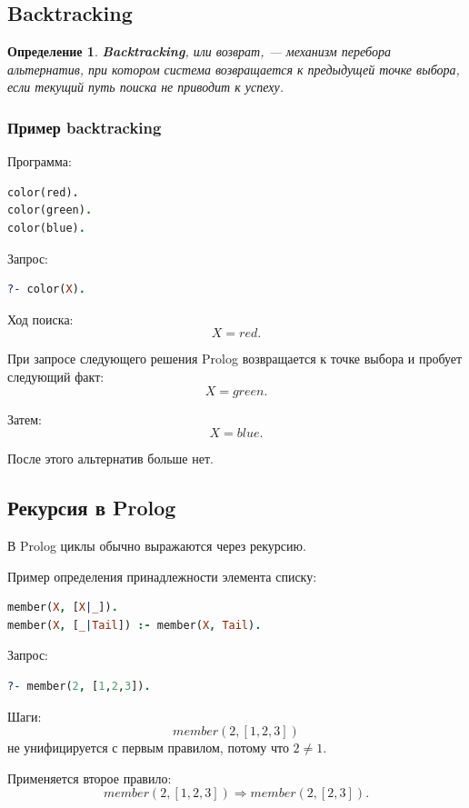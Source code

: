 \documentclass[12pt,a4paper]{article}
\newtheorem{definition}{Определение}
\begin{document}
\subsection{Backtracking}

\begin{definition}
\textbf{Backtracking}, или возврат, --- механизм перебора альтернатив, при котором система возвращается к предыдущей точке выбора, если текущий путь поиска не приводит к успеху.
\end{definition}

\subsubsection{Пример backtracking}

Программа:
\begin{lstlisting}[language=Prolog]
color(red).
color(green).
color(blue).
\end{lstlisting}

Запрос:
\begin{lstlisting}[language=Prolog]
?- color(X).
\end{lstlisting}

Ход поиска:
\[
X = red.
\]

При запросе следующего решения Prolog возвращается к точке выбора и пробует следующий факт:
\[
X = green.
\]

Затем:
\[
X = blue.
\]

После этого альтернатив больше нет.

\subsection{Рекурсия в Prolog}

В Prolog циклы обычно выражаются через рекурсию.

Пример определения принадлежности элемента списку:
\begin{lstlisting}[language=Prolog]
member(X, [X|_]).
member(X, [_|Tail]) :- member(X, Tail).
\end{lstlisting}

Запрос:
\begin{lstlisting}[language=Prolog]
?- member(2, [1,2,3]).
\end{lstlisting}

Шаги:
\[
member(2,[1,2,3])
\]
не унифицируется с первым правилом, потому что $2 \neq 1$.

Применяется второе правило:
\[
member(2,[1,2,3]) \Rightarrow member(2,[2,3]).
\]
\end{document}
